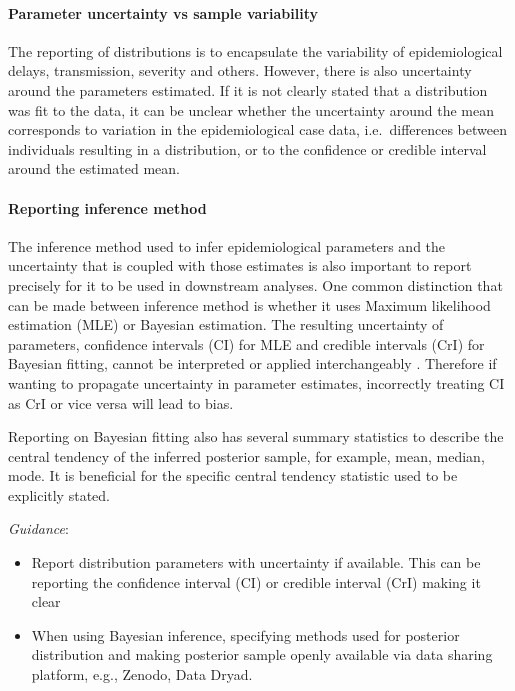 \documentclass[
  10pt,
  letterpaper,
]{article}
\providecommand{\tightlist}{%
  \setlength{\itemsep}{0pt}\setlength{\parskip}{0pt}}\usepackage{longtable,booktabs,array}
\begin{document}
\paragraph{Parameter uncertainty vs sample
variability}\label{parameter-uncertainty-vs-sample-variability}

The reporting of distributions is to encapsulate the variability of
epidemiological delays, transmission, severity and others. However,
there is also uncertainty around the parameters estimated. If it is not
clearly stated that a distribution was fit to the data, it can be
unclear whether the uncertainty around the mean corresponds to variation
in the epidemiological case data, i.e.~differences between individuals
resulting in a distribution, or to the confidence or credible interval
around the estimated mean.

\paragraph{Reporting inference method}\label{reporting-inference-method}

The inference method used to infer epidemiological parameters and the
uncertainty that is coupled with those estimates is also important to
report precisely for it to be used in downstream analyses. One common
distinction that can be made between inference method is whether it uses
Maximum likelihood estimation (MLE) or Bayesian estimation. The
resulting uncertainty of parameters, confidence intervals (CI) for MLE
and credible intervals (CrI) for Bayesian fitting, cannot be interpreted
or applied interchangeably \citep{moreyFallacyPlacingConfidence2016}.
Therefore if wanting to propagate uncertainty in parameter estimates,
incorrectly treating CI as CrI or vice versa will lead to bias.

Reporting on Bayesian fitting also has several summary statistics to
describe the central tendency of the inferred posterior sample, for
example, mean, median, mode. It is beneficial for the specific central
tendency statistic used to be explicitly stated.

\emph{Guidance}:

\begin{itemize}
\tightlist
\item
  Report distribution parameters with uncertainty if available. This can
  be reporting the confidence interval (CI) or credible interval (CrI)
  making it clear
\item
  When using Bayesian inference, specifying methods used for posterior
  distribution and making posterior sample openly available via data
  sharing platform, e.g., Zenodo, Data Dryad.
\end{itemize}
\end{document}
